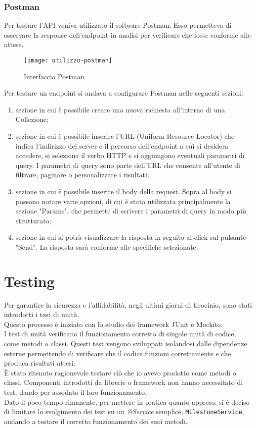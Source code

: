 \subsubsection{Postman}
Per testare l'API veniva utilizzato il software Postman. Esso permetteva di osservare la response dell'endpoint in analisi per verificare che fosse conforme alle attese.\\

\begin{figure}[H] 
    \centering 
    \texttt{[image: utilizzo-postman]} 
    \caption{Interfaccia Postman}
\end{figure}
\noindent Per testare un endpoint si andava a configurare Postman nelle seguenti sezioni:
\begin{enumerate}
\item sezione in cui è possibile creare una nuova richiesta all'interno di una Collezione;
\item sezione in cui è possibile inserire l'URL (Uniform Resource Locator) che indica l'indirizzo del server e il percorso dell'endpoint a cui si desidera accedere, si seleziona il verbo HTTP e si aggiungono eventuali parametri di query. I parametri di query sono parte dell'URL che consente all'utente di filtrare, paginare o personalizzare i risultati;
\item sezione in cui è possibile inserire il body della request. Sopra al body si possono notare varie opzioni, di cui è stata utilizzata principalmente la sezione "Params", che permette di scrivere i parametri di query in modo più strutturato;
\item sezione in cui si potrà visualizzare la risposta in seguito al click sul pulsante "Send". La risposta sarà conforme alle specifiche selezionate.
\end{enumerate}

\section{Testing}
Per garantire la sicurezza e l’affidabilità, negli ultimi giorni di tirocinio, sono stati introdotti i test di unità.\\
Questo processo è iniziato con lo studio dei framework JUnit e Mockito.\\
I test di unità verificano il funzionamento corretto di singole unità di codice, come metodi o classi. Questi test vengono sviluppati isolandosi dalle dipendenze esterne permettendo di verificare che il codice funzioni correttamente e che produca risultati attesi.\\
È stato ritenuto ragionevole testare ciò che io avevo prodotto come metodi o classi. Componenti introdotti da librerie o framework non hanno necessitato di test, dando per assodato il loro funzionamento.\\
Dato il poco tempo rimanente, per mettere in pratica quanto appreso, si è deciso di limitare lo svolgimento dei test su un \textit{@Service} semplice, \texttt{MilestoneService}, andando a testare il corretto funzionamento dei suoi metodi.

